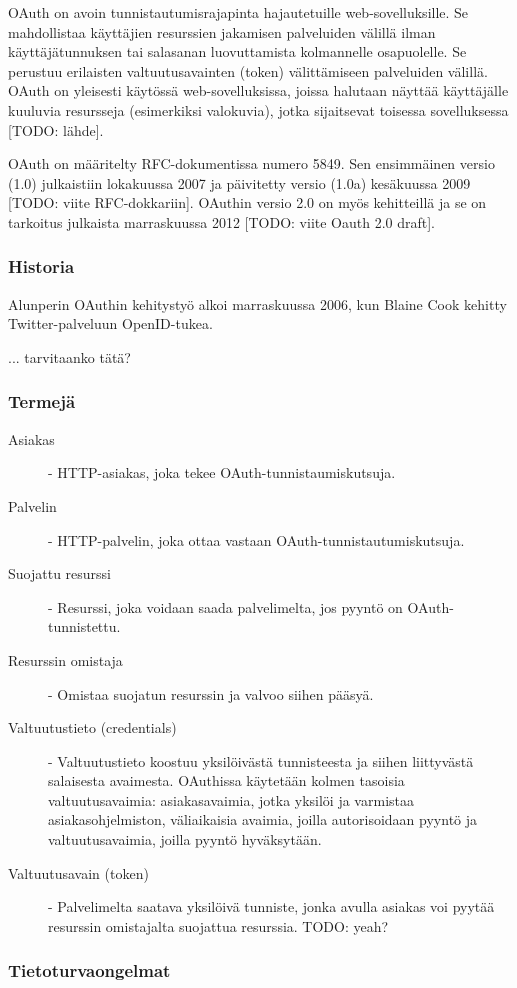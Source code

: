 OAuth on avoin tunnistautumisrajapinta hajautetuille web-sovelluksille. Se mahdollistaa käyttäjien resurssien jakamisen palveluiden välillä ilman käyttäjätunnuksen tai salasanan luovuttamista kolmannelle osapuolelle. Se perustuu erilaisten valtuutusavainten (token) välittämiseen palveluiden välillä. OAuth on yleisesti käytössä web-sovelluksissa, joissa halutaan näyttää käyttäjälle kuuluvia resursseja (esimerkiksi valokuvia), jotka sijaitsevat toisessa sovelluksessa [TODO: lähde].

OAuth on määritelty RFC-dokumentissa numero 5849. Sen ensimmäinen versio (1.0) julkaistiin lokakuussa 2007 ja päivitetty versio (1.0a) kesäkuussa 2009 [TODO: viite RFC-dokkariin]. OAuthin versio 2.0 on myös kehitteillä ja se on tarkoitus julkaista marraskuussa 2012 [TODO: viite Oauth 2.0 draft].

\subsubsection{Historia}

Alunperin OAuthin kehitystyö alkoi marraskuussa 2006, kun Blaine Cook kehitty Twitter-palveluun OpenID-tukea. 

... tarvitaanko tätä?

\subsubsection{Termejä}

\begin{description}
  \item[Asiakas] - HTTP-asiakas, joka tekee OAuth-tunnistaumiskutsuja.

  \item[Palvelin] - HTTP-palvelin, joka ottaa vastaan OAuth-tunnistautumiskutsuja.
  
  \item[Suojattu resurssi] - Resurssi, joka voidaan saada palvelimelta, jos pyyntö on OAuth-tunnistettu.
  
  \item[Resurssin omistaja] - Omistaa suojatun resurssin ja valvoo siihen pääsyä.
  
  \item[Valtuutustieto (credentials)] - Valtuutustieto koostuu yksilöivästä tunnisteesta ja siihen liittyvästä salaisesta avaimesta. OAuthissa käytetään kolmen tasoisia valtuutusavaimia: asiakasavaimia, jotka yksilöi ja varmistaa asiakasohjelmiston, väliaikaisia avaimia, joilla autorisoidaan pyyntö ja valtuutusavaimia, joilla pyyntö hyväksytään.
  
  \item[Valtuutusavain (token)] - Palvelimelta saatava yksilöivä tunniste, jonka avulla asiakas voi pyytää resurssin omistajalta suojattua resurssia. TODO: yeah?
\end{description}

\subsubsection{Tietoturvaongelmat}


